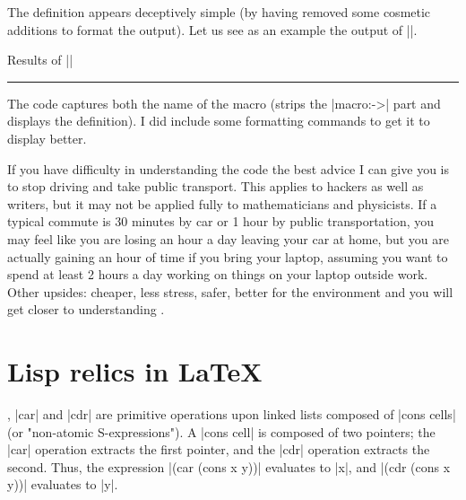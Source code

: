 \begin{teX}
\def\reflect{\@star@or@long\accommand}
\def\accommand#1{\string#1:%
  \expandafter\strip@prefix\meaning#1} 
\end{teX}

\noindent The definition appears deceptively simple (by having removed some cosmetic additions to format the output). Let us see as an example the output of ||.
\bigskip


\hfil\hfill Results of || 

\smallskip


\hrule
\medskip
\makeatletter
\def\showcommand{\@star@or@long\accommand}
\fboxrule=0.0pt
\def\accommand#1{\framebox[3cm][l]{\bf\color{red} 
    \string#1:~~} %
     \parbox[t]{7cm}{\expandafter\strip@prefix\meaning#1}} 
\showcommand*{\frogking}
\makeatother
\smallskip



\bigskip


The code captures both the name of the macro (strips the |macro:->| part and displays the definition). I did include some formatting commands to get it to display better.

If you have difficulty in understanding the code the best advice I can give you is to stop driving and take public transport. This applies to hackers as well as writers, but it may not be applied fully to mathematicians and physicists. If a typical commute is 30 minutes by car or 1 hour by public transportation, you may feel like you are losing an hour a day leaving your car at home, but you are actually gaining an hour of time if you bring your laptop, assuming you want to spend at least 2 hours a day working on things on your laptop outside work. Other upsides: cheaper, less stress, safer, better for the environment and you will get closer to understanding \tex.


\section*{Lisp relics in \protect\LaTeX\ }
, |car| and |cdr| are primitive operations upon linked lists composed of |cons cells| (or "non-atomic S-expressions"). A |cons cell| is composed of two pointers; the |car| operation extracts the first pointer, and the |cdr| operation extracts the second.
Thus, the expression |(car (cons x y))| evaluates to |x|, and |(cdr (cons x y))| evaluates to |y|.


